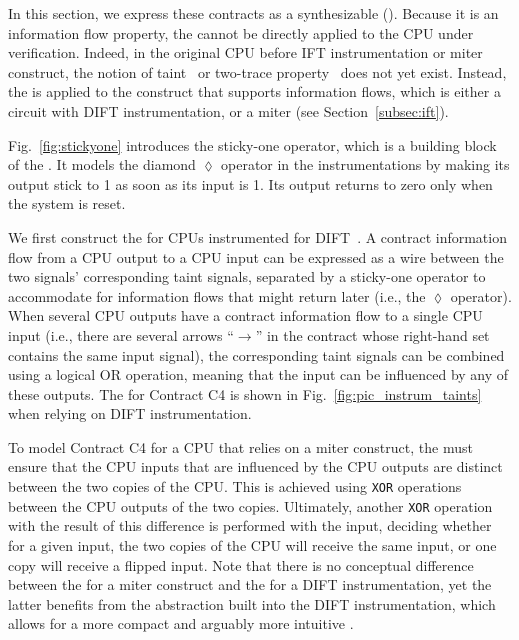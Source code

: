 
In this section, we express these contracts as a synthesizable \pici (\PICI).
Because it is an information flow property, the \PICI cannot be directly applied to the CPU under verification.
Indeed, in the original CPU before IFT instrumentation or miter construct, the notion of taint~\cite{solt2022cellift,ceesay2024mucfi} or two-trace property~\cite{wang2023specification,dinesh2024conjunct,dinesh2025h,tan2025contractshadowlogic} does not yet exist.
Instead, the \PICI is applied to the construct that supports information flows, which is either a circuit with DIFT instrumentation, or a miter (see Section~\ref{subsec:ift}).

Fig.~\ref{fig:stickyone} introduces the sticky-one operator, which is a building block of the \PICI.
It models the diamond $\lozenge$ operator in the instrumentations by making its output stick to 1 as soon as its input is 1.
Its output returns to zero only when the system is reset.

We first construct the \PICI for CPUs instrumented for DIFT~\cite{tiwari2009complete,solt2022cellift}.
A contract information flow from a CPU output to a CPU input can be expressed as a wire between the two signals' corresponding taint signals, separated by a sticky-one operator to accommodate for information flows that might return later (i.e., the $\lozenge$ operator).
When several CPU outputs have a contract information flow to a single CPU input (i.e., there are several arrows ``$\rightarrow$'' in the contract whose right-hand set contains the same input signal), the corresponding taint signals can be combined using a logical OR operation, meaning that the input can be influenced by any of these outputs.
The \PICI for Contract C4 is shown in Fig.~\ref{fig:pic_instrum_taints} when relying on DIFT instrumentation.

To model Contract C4 for a CPU that relies on a miter construct, the \PICI must ensure that the CPU inputs that are influenced by the CPU outputs are distinct between the two copies of the CPU.
This is achieved using \texttt{XOR} operations between the CPU outputs of the two copies.
Ultimately, another \texttt{XOR} operation with the result of this difference is performed with the input, deciding whether for a given input, the two copies of the CPU will receive the same input, or one copy will receive a flipped input.
Note that there is no conceptual difference between the \PICI for a miter construct and the \PICI for a DIFT instrumentation, yet the latter benefits from the abstraction built into the DIFT instrumentation, which allows for a more compact and arguably more intuitive \PICI.

